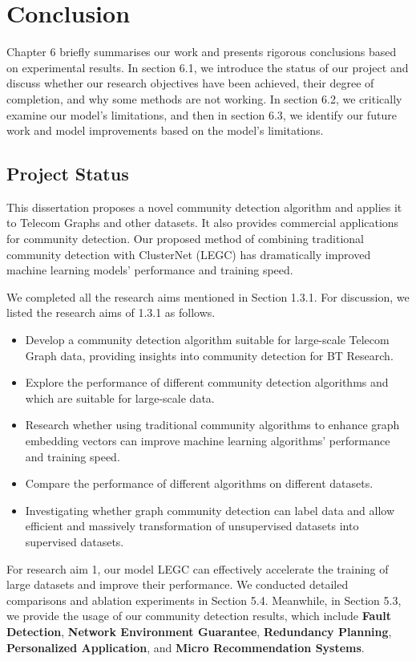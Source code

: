 \documentclass[ %
                    author={Tengyao Tu},
                supervisor={Dr. James Pope},
                    degree={MSc},
                     title={A New Perspective on Graph Community Detection: Combining Traditional Methods with Deep Learning Approaches},
                  subtitle={Applying to Telecom Networks and Diverse Datasets},
                      type={},
                      year={2024}]{dissertation}
\begin{document}
\chapter{Conclusion}
\label{chap:conclusion}
Chapter 6 briefly summarises our work and presents rigorous conclusions based on experimental results. In section 6.1, we introduce the status of our project and discuss whether our research objectives have been achieved, their degree of completion, and why some methods are not working. In section 6.2, we critically examine our model's limitations, and then in section 6.3, we identify our future work and model improvements based on the model's limitations.
\section{Project Status}
This dissertation proposes a novel community detection algorithm and applies it to Telecom Graphs and other datasets. It also provides commercial applications for community detection. Our proposed method of combining traditional community detection with ClusterNet (LEGC) has dramatically improved machine learning models' performance and training speed. 

We completed all the research aims mentioned in Section 1.3.1. For discussion, we listed the research aims of 1.3.1 as follows.
\begin{itemize}
\item Develop a community detection algorithm suitable for large-scale Telecom Graph data, providing insights into community detection for BT Research.
\item Explore the performance of different community detection algorithms and which are suitable for large-scale data.
\item Research whether using traditional community algorithms to enhance graph embedding vectors can improve machine learning algorithms' performance and training speed.
\item Compare the performance of different algorithms on different datasets.
\item Investigating whether graph community detection can label data and allow efficient and massively transformation of unsupervised datasets into supervised datasets.
\end{itemize}
For research aim 1, our model LEGC can effectively accelerate the training of large datasets and improve their performance. We conducted detailed comparisons and ablation experiments in Section 5.4. Meanwhile, in Section 5.3, we provide the usage of our community detection results, which include \textbf{Fault Detection}, \textbf{Network Environment Guarantee}, \textbf{Redundancy Planning}, \textbf{Personalized Application}, and \textbf{Micro Recommendation Systems}.
\end{document}

